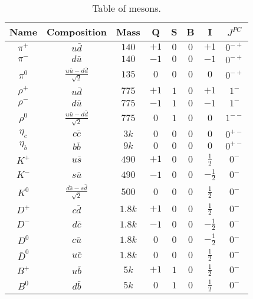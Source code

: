 \documentclass{article}
\begin{document}
\begin{table}[h!]
    \centering
    \begin{tabular}{||c c c c c c c c||} 
    \hline
    Name & Composition & Mass & Q & S & B & I & $J^{PC}$ \\ [0.5ex] 
    \hline\hline
    $\pi^+$ & $u\bar{d}$ & $140$ & $+1$ & $0$ & $0$ & $+1$ & $0^{-+}$ \\[1ex]
    $\pi^-$ & $d\bar{u}$ & $140$ & $-1$ & $0$ & $0$ & $-1$ & $0^{-+}$ \\[1ex]
    $\pi^0$ & $\frac{u\bar{u}-d\bar{d}}{\sqrt{2}}$ & $135$ & $0$ & $0$ & $0$ & $0$ & $0^{-+}$ \\[1ex]
    $\rho^+$ & $u\bar{d}$ & $775$ & $+1$ & $1$ & $0$ & $+1$ & $1^{-}$ \\[1ex]
    $\rho^-$ & $d\bar{u}$ & $775$ & $-1$ & $1$ & $0$ & $-1$ & $1^{-}$ \\[1ex]
    $\rho^0$ & $\frac{u\bar{u}-d\bar{d}}{\sqrt{2}}$ & $775$ & $0$ & $1$ & $0$ & $0$ & $1^{--}$ \\[1ex]
    $\eta_c$ & $c\bar{c}$ & $3k$ & $0$ & $0$ & $0$ & $0$ & $0^{+-}$ \\[1ex]
    $\eta_b$ & $b\bar{b}$ & $9k$ & $0$ & $0$ & $0$ & $0$ & $0^{+-}$ \\[1ex]
    $K^+$ & $u\bar{s}$ & $490$ & $+1$ & $0$ & $0$ & $\frac{1}{2}$ & $0^{-}$ \\[1ex]
    $K^-$ & $s\bar{u}$ & $490$ & $-1$ & $0$ & $0$ & $-\frac{1}{2}$ & $0^{-}$ \\[1ex]
    $K^0$ & $\frac{d\bar{s}-s\bar{d}}{\sqrt{2}}$ & $500$ & $0$ & $0$ & $0$ & $\frac{1}{2}$ & $0^{-}$ \\[1ex]
    $D^+$ & $c\bar{d}$ & $1.8k$ & $+1$ & $0$ & $0$ & $\frac{1}{2}$ & $0^{-}$ \\[1ex]
    $D^-$ & $d\bar{c}$ & $1.8k$ & $-1$ & $0$ & $0$ & $-\frac{1}{2}$ & $0^{-}$ \\[1ex]
    $D^0$ & $c\bar{u}$ & $1.8k$ & $0$ & $0$ & $0$ & $-\frac{1}{2}$ & $0^{-}$ \\[1ex]
    $\bar{D}^0$ & $u\bar{c}$ & $1.8k$ & $0$ & $0$ & $0$ & $\frac{1}{2}$ & $0^{-}$ \\[1ex]
    $B^+$ & $u\bar{b}$ & $5k$ & $+1$ & $1$ & $0$ & $\frac{1}{2}$ & $0^{-}$ \\[1ex]
    $B^0$ & $d\bar{b}$ & $5k$ & $0$ & $1$ & $0$ & $\frac{1}{2}$ & $0^{-}$ \\[1ex]
    \hline
    \end{tabular}
    \caption{Table of mesons.}
    \label{table:mesons}
\end{table}
\end{document}
